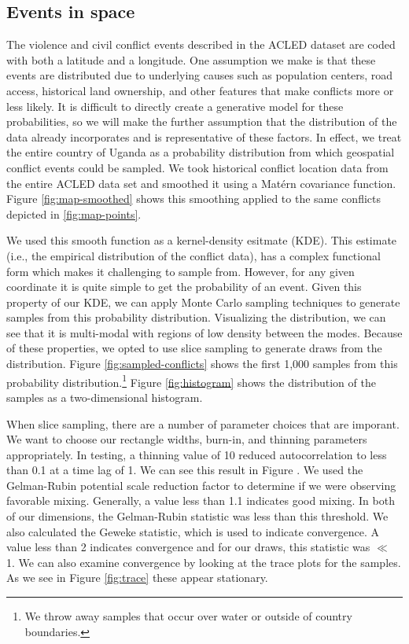 \documentclass{article} %
\begin{document}
\subsection{Events in space}

The violence and civil conflict events described in the ACLED dataset are coded with both a latitude and a longitude. One assumption we make is that these events are distributed due to underlying causes such as population centers, road access, historical land ownership, and other features that make conflicts more or less likely. It is difficult to directly create a generative model for these probabilities, so we will make the further assumption that the distribution of the data already incorporates and is representative of these factors. In effect, we treat the entire country of Uganda as a probability distribution from which geospatial conflict events could be sampled.  We took historical conflict location data from the entire ACLED data set and smoothed it using a Mat\'{e}rn covariance function.  Figure \ref{fig:map-smoothed} shows this smoothing applied to the same conflicts depicted in \ref{fig:map-points}.

We used this smooth function as a kernel-density esitmate (KDE). This estimate (i.e., the empirical distribution of the conflict data), has a complex functional form which makes it challenging to sample from. However, for any given coordinate it is quite simple to get the probability of an event. Given this property of our KDE, we can apply Monte Carlo sampling techniques to generate samples from this probability distribution. Visualizing the distribution, we can see that it is multi-modal with regions of low density between the modes. Because of these properties, we opted to use slice sampling to generate draws from the distribution. Figure \ref{fig:sampled-conflicts} shows the first 1,000 samples from this probability distribution.\footnote{We throw away samples that occur over water or outside of country boundaries.} Figure \ref{fig:histogram} shows the distribution of the samples as a two-dimensional histogram.

When slice sampling, there are a number of parameter choices that are imporant. We want to choose our rectangle widths, burn-in, and thinning parameters appropriately. In testing, a thinning value of 10 reduced autocorrelation to less than 0.1 at a time lag of 1. We can see this result in Figure . We used the Gelman-Rubin potential scale reduction factor\cite{Gelman-Rubin} to determine if we were observing favorable mixing. Generally, a value less than 1.1 indicates good mixing. In both of our dimensions, the Gelman-Rubin statistic was less than this threshold. We also calculated the Geweke statistic, which is used to indicate convergence. A value less than 2 indicates convergence and for our draws, this statistic was $\ll$ 1. We can also examine convergence by looking at the trace plots for the samples. As we see in Figure \ref{fig:trace} these appear stationary.
\end{document}

